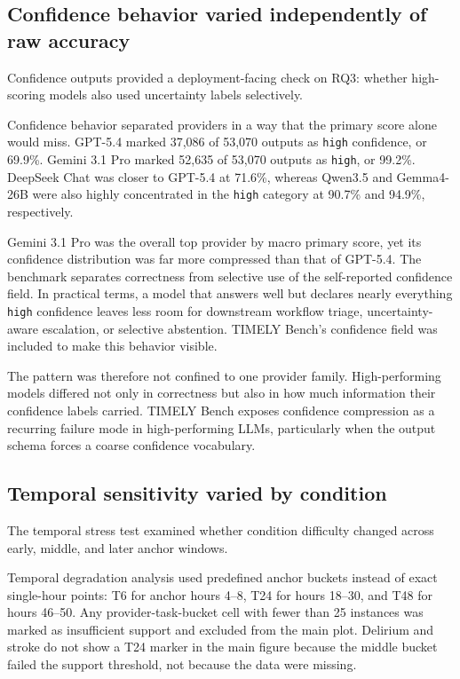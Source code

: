\documentclass[pdflatex,sn-nature]{sn-jnl}
\begin{document}
\subsection{Confidence behavior varied independently of raw accuracy}

Confidence outputs provided a deployment-facing check on RQ3: whether high-scoring models also used uncertainty labels selectively.

Confidence behavior separated providers in a way that the primary score alone would miss. GPT-5.4 marked 37,086 of 53,070 outputs as \texttt{high} confidence, or 69.9\%. Gemini 3.1 Pro marked 52,635 of 53,070 outputs as \texttt{high}, or 99.2\%. DeepSeek Chat was closer to GPT-5.4 at 71.6\%, whereas Qwen3.5 and Gemma4-26B were also highly concentrated in the \texttt{high} category at 90.7\% and 94.9\%, respectively.

Gemini 3.1 Pro was the overall top provider by macro primary score, yet its confidence distribution was far more compressed than that of GPT-5.4. The benchmark separates correctness from selective use of the self-reported confidence field. In practical terms, a model that answers well but declares nearly everything \texttt{high} confidence leaves less room for downstream workflow triage, uncertainty-aware escalation, or selective abstention. TIMELY Bench's confidence field was included to make this behavior visible.

The pattern was therefore not confined to one provider family. High-performing models differed not only in correctness but also in how much information their confidence labels carried. TIMELY Bench exposes confidence compression as a recurring failure mode in high-performing LLMs, particularly when the output schema forces a coarse confidence vocabulary.

\subsection{Temporal sensitivity varied by condition}

The temporal stress test examined whether condition difficulty changed across early, middle, and later anchor windows.

Temporal degradation analysis used predefined anchor buckets instead of exact single-hour points: T6 for anchor hours 4--8, T24 for hours 18--30, and T48 for hours 46--50. Any provider-task-bucket cell with fewer than 25 instances was marked as insufficient support and excluded from the main plot. Delirium and stroke do not show a T24 marker in the main figure because the middle bucket failed the support threshold, not because the data were missing.
\end{document}
